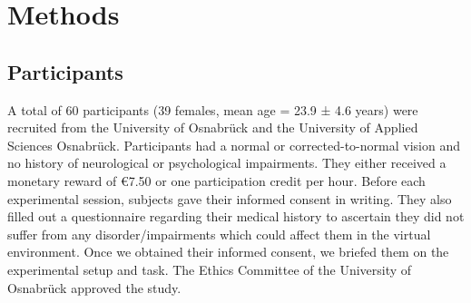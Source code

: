 \section{Methods}
\subsection{Participants}
A total of 60 participants (39 females, mean age = 23.9 ± 4.6 years) were recruited from the University of Osnabr{\"u}ck and the University of Applied Sciences Osnabr{\"u}ck. Participants had a normal or corrected-to-normal vision and no history of neurological or psychological impairments. They either received a monetary reward of €7.50 or one participation credit per hour. Before each experimental session, subjects gave their informed consent in writing. They also filled out a questionnaire regarding their medical history to ascertain they did not suffer from any disorder/impairments which could affect them in the virtual environment. Once we obtained their informed consent, we briefed them on the experimental setup and task. The Ethics Committee of the University of Osnabr{\"u}ck approved the study. 

